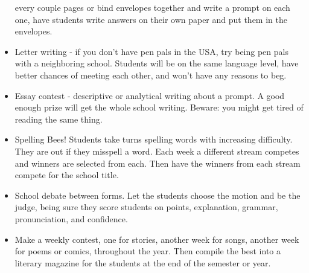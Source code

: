 \begin{itemize}
every couple pages or bind envelopes together and write a prompt on
each one, have students write answers on their own paper and put them
in the envelopes.  
\item Letter writing - if you don't have pen pals in the USA, try being
pen pals with a neighboring school. Students will be on the same
language level, have better chances of meeting each other, and won't
have any reasons to beg. 
\item Essay contest - descriptive or analytical writing about a prompt.
A good enough prize will get the whole school writing. Beware: you
might get tired of reading the same thing.  
\item Spelling Bees! Students take turns spelling words with increasing
difficulty. They are out if they misspell a word. Each week a different
stream competes and winners are selected from each. Then have the
winners from each stream compete for the school title.  
\item School debate between forms. Let the students choose the motion and
be the judge, being sure they score students on points, explanation,
grammar, pronunciation, and confidence.  
\item Make a weekly contest, one for stories, another week for songs, another
week for poems or comics, throughout the year. Then compile the best
into a literary magazine for the students at the end of the semester
or year. 
\end{itemize}

